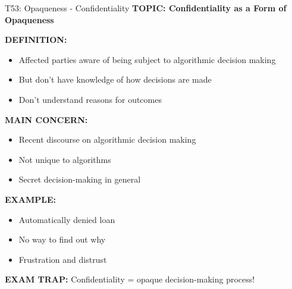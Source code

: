 \documentclass[8pt]{beamer}
\begin{document}
	\begin{frame}{T53: Opaqueness - Confidentiality}
		\fontsize{6.5}{7.5}\selectfont
		\textbf{TOPIC: Confidentiality as a Form of Opaqueness}
		
		\vspace{0.1cm}
		\textbf{DEFINITION:}
		\begin{itemize}
			\item Affected parties aware of being subject to algorithmic decision making
			\item But don't have knowledge of how decisions are made
			\item Don't understand reasons for outcomes
		\end{itemize}
		
		\vspace{0.1cm}
		\textbf{MAIN CONCERN:}
		\begin{itemize}
			\item Recent discourse on algorithmic decision making
			\item Not unique to algorithms
			\item Secret decision-making in general
		\end{itemize}
		
		\vspace{0.1cm}
		\textbf{EXAMPLE:}
		\begin{itemize}
			\item Automatically denied loan
			\item No way to find out why
			\item Frustration and distrust
		\end{itemize}
		
		\textcolor{myred}{\textbf{EXAM TRAP:}} Confidentiality = \textcolor{myblue}{opaque decision-making process}!
	\end{frame}
	
\end{document}

